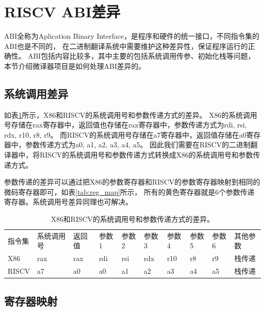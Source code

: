 \section{RISCV ABI差异}
ABI全称为Aplication Binary Interface，是程序和硬件的统一接口，不同指令集的ABI也是不同的，
在二进制翻译系统中需要维护这种差异性，保证程序运行的正确性。
ABI包括内容比较多，其中主要的包括系统调用传参、初始化栈等问题，本节介绍微译器项目是如何处理ABI差异的。


\subsection{系统调用差异}

如表\ref{tab:syscall}所示，X86和RISCV的系统调用号和参数传递方式的差异。
X86的系统调用号存储在rax寄存器中，返回值也存储在rax寄存器中，参数传递方式为rdi, rsi, rdx, r10, r8, r9。
而RISCV的系统调用号存储在a7寄存器中，返回值存储在a0寄存器中，参数传递方式为a0, a1, a2, a3, a4, a5。
因此我们需要在RISCV的二进制翻译器中，将RISCV的系统调用号和参数传递方式转换成X86的系统调用号和参数传递方式。

参数传递的差异可以通过把X86的参数寄存器和RISCV的参数寄存器映射到相同的微码寄存器即可，如表\ref{tab:reg_map}所示，
所有的黄色寄存器就是6个参数传递寄存器。系统调用号差异同理也可解决。



\begin{table}[h]
    \centering
    \begin{adjustbox}{width=\textwidth}
      \begin{tabular}{llllllllll}
      \rowcolor[HTML]{FFCC67} 
      \cellcolor[HTML]{FBE5D6}指令集 & \cellcolor[HTML]{FBE5D6}系统调用号 & \cellcolor[HTML]{FBE5D6}返回值 & 参数1 & 参数2 & 参数3 & 参数4 & 参数5 & 参数6 & 其他参数 \\
      X86                         & rax                           & rax                         & rdi & rsi & rdx & r10 & r8  & r9  & 栈传递  \\
      RISCV                       & a7                            & a0                          & a0  & a1  & a2  & a3  & a4  & a5  & 栈传递 
      \end{tabular}
    \end{adjustbox}
    \caption{X86和RISCV的系统调用号和参数传递方式的差异。}
    \label{tab:syscall}
  \end{table}
  

\subsection{寄存器映射}

